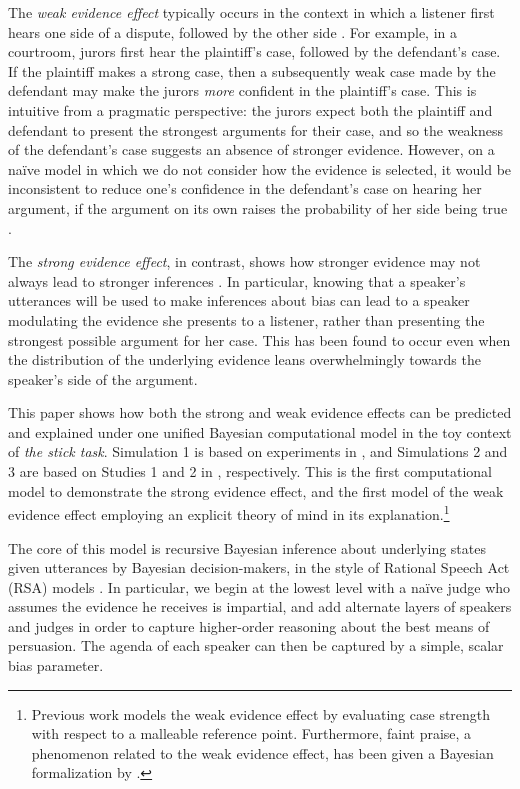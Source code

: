 \documentclass[10pt,letterpaper]{article}
\begin{document}
The \textit{weak evidence effect} typically occurs in the context in which a listener first
hears one side of a dispute, followed by the other side \cite{mckenzie_when_2002}.  For example, in a courtroom, jurors first
hear the plaintiff's case, followed by the defendant's case. If the plaintiff makes a strong case, then
a subsequently weak case made by the defendant may make the jurors \textit{more} confident in the 
plaintiff's case. This is intuitive from a pragmatic perspective: the jurors expect both the plaintiff and 
defendant to present the strongest arguments for their case, and so the weakness of the defendant's
case suggests an absence of stronger evidence. However, on a na\"ive model in which we do not
consider how the evidence is selected, it would be inconsistent to reduce one's confidence in the
defendant's case on hearing her argument, if the argument on its own raises the probability of her
side being true \cite{fernbach_when_2011}.

The \textit{strong evidence effect}, in contrast, shows how stronger evidence may not always lead
to stronger inferences \cite{perfors_stronger_2018}. In particular, knowing that a speaker's utterances will be used to make inferences
about bias can lead to a speaker modulating the evidence she presents to a listener, rather than presenting
the strongest possible argument for her case. This has been found to occur even when the distribution
of the underlying evidence leans overwhelmingly towards the speaker's side of the argument.

This paper shows how both the strong and weak evidence effects can be predicted and explained under
one unified Bayesian computational model in the toy context of \textit{the stick task}. 
Simulation 1 is based on experiments in , and Simulations 2 and 3 are based on
Studies 1 and 2 in , respectively.
This is the first computational model to demonstrate the 
strong evidence effect, and the first model of the weak evidence effect employing an explicit theory of mind
in its explanation.\footnote{Previous work models the weak evidence effect by evaluating case strength with
respect to a malleable reference point. Furthermore, faint praise, a phenomenon related to the weak evidence effect,
has been given a Bayesian formalization by .}

The core of this model is recursive Bayesian inference about underlying states given utterances by Bayesian
decision-makers, in the style of Rational Speech Act (RSA) models \cite{goodman_pragmatic_2016}. In particular, we begin at the lowest level
with a na\"ive judge who assumes the evidence he receives is impartial, and add alternate layers of speakers
and judges in order to capture higher-order reasoning about the best means of persuasion. The agenda
of each speaker can then be captured by a simple, scalar bias parameter.
\end{document}
